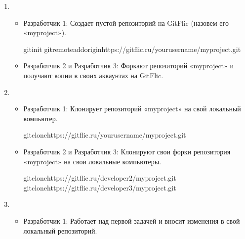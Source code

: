 \documentclass[letterpaper,10pt,russian]{sphinxmanual}
\begin{document}
\begin{enumerate}
%
\item {} 
\sphinxAtStartPar
{}
\begin{itemize}
\item {} 
\sphinxAtStartPar
Разработчик 1: Создает пустой репозиторий на GitFlic (назовем его «myproject»).

\begin{sphinxVerbatim}[commandchars=\\\{\}]
gitinit
gitremoteaddoriginhttps://gitflic.ru/yourusername/myproject.git
\end{sphinxVerbatim}

\item {} 
\sphinxAtStartPar
Разработчик 2 и Разработчик 3: Форкают репозиторий «myproject» и получают копии в своих аккаунтах на GitFlic.

\end{itemize}

\item {} 
\sphinxAtStartPar
{}
\begin{itemize}
\item {} 
\sphinxAtStartPar
Разработчик 1: Клонирует репозиторий «myproject» на свой локальный компьютер.

\begin{sphinxVerbatim}[commandchars=\\\{\}]
gitclonehttps://gitflic.ru/yourusername/myproject.git
\end{sphinxVerbatim}

\item {} 
\sphinxAtStartPar
Разработчик 2 и Разработчик 3: Клонируют свои форки репозитория «myproject» на свои локальные компьютеры.

\begin{sphinxVerbatim}[commandchars=\\\{\}]
gitclonehttps://gitflic.ru/developer2/myproject.git
gitclonehttps://gitflic.ru/developer3/myproject.git
\end{sphinxVerbatim}

\end{itemize}

\item {} 
\sphinxAtStartPar
{}
\begin{itemize}
\item {} 
\sphinxAtStartPar
Разработчик 1: Работает над первой задачей и вносит изменения в свой локальный репозиторий.


\end{itemize}
\end{enumerate}
\end{document}
